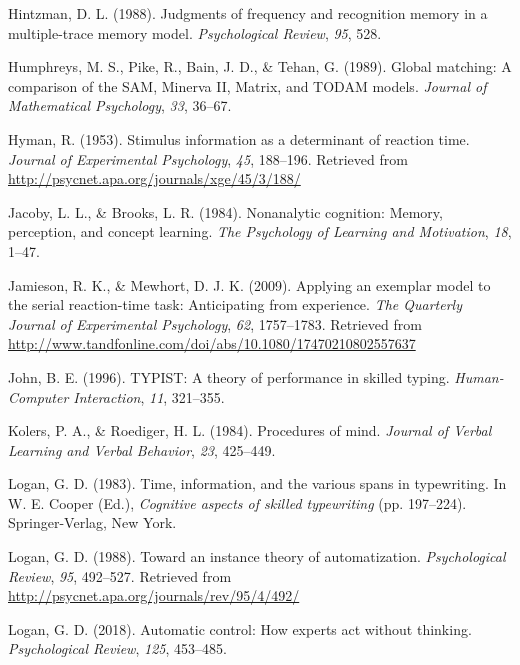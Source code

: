 \documentclass[,man,floatsintext]{apa6}
\begin{document}
\leavevmode\hypertarget{ref-hintzman_judgments_1988}{}%
Hintzman, D. L. (1988). Judgments of frequency and recognition memory in a multiple-trace memory model. \emph{Psychological Review}, \emph{95}, 528.

\leavevmode\hypertarget{ref-humphreys_global_1989}{}%
Humphreys, M. S., Pike, R., Bain, J. D., \& Tehan, G. (1989). Global matching: A comparison of the SAM, Minerva II, Matrix, and TODAM models. \emph{Journal of Mathematical Psychology}, \emph{33}, 36--67.

\leavevmode\hypertarget{ref-hyman_stimulus_1953}{}%
Hyman, R. (1953). Stimulus information as a determinant of reaction time. \emph{Journal of Experimental Psychology}, \emph{45}, 188--196. Retrieved from \url{http://psycnet.apa.org/journals/xge/45/3/188/}

\leavevmode\hypertarget{ref-JacobyNonanalyticcognitionMemory1984}{}%
Jacoby, L. L., \& Brooks, L. R. (1984). Nonanalytic cognition: Memory, perception, and concept learning. \emph{The Psychology of Learning and Motivation}, \emph{18}, 1--47.

\leavevmode\hypertarget{ref-jamieson_applying_2009}{}%
Jamieson, R. K., \& Mewhort, D. J. K. (2009). Applying an exemplar model to the serial reaction-time task: Anticipating from experience. \emph{The Quarterly Journal of Experimental Psychology}, \emph{62}, 1757--1783. Retrieved from \url{http://www.tandfonline.com/doi/abs/10.1080/17470210802557637}

\leavevmode\hypertarget{ref-john_typist:_1996}{}%
John, B. E. (1996). TYPIST: A theory of performance in skilled typing. \emph{Human-Computer Interaction}, \emph{11}, 321--355.

\leavevmode\hypertarget{ref-KolersProceduresmind1984}{}%
Kolers, P. A., \& Roediger, H. L. (1984). Procedures of mind. \emph{Journal of Verbal Learning and Verbal Behavior}, \emph{23}, 425--449.

\leavevmode\hypertarget{ref-logan_span_1983}{}%
Logan, G. D. (1983). Time, information, and the various spans in typewriting. In W. E. Cooper (Ed.), \emph{Cognitive aspects of skilled typewriting} (pp. 197--224). Springer-Verlag, New York.

\leavevmode\hypertarget{ref-logan_toward_1988}{}%
Logan, G. D. (1988). Toward an instance theory of automatization. \emph{Psychological Review}, \emph{95}, 492--527. Retrieved from \url{http://psycnet.apa.org/journals/rev/95/4/492/}

\leavevmode\hypertarget{ref-logan_2018}{}%
Logan, G. D. (2018). Automatic control: How experts act without thinking. \emph{Psychological Review}, \emph{125}, 453--485.
\end{document}
